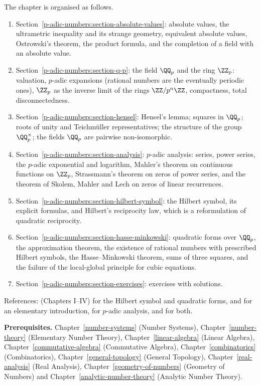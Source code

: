 The chapter is organised as follows.
\begin{enumerate}
\item Section~\ref{p-adic-numbers:section-absolute-values}: absolute values, the ultrametric inequality and its strange geometry, equivalent absolute values, Ostrowski's theorem, the product formula, and
the completion of a field with an absolute value.
\item Section~\ref{p-adic-numbers:section-q-p}: the field $\QQ_p$ and the ring $\ZZ_p$: valuation, $p$-adic expansions (rational numbers are the eventually periodic ones), $\ZZ_p$ as the inverse limit
of the rings $\ZZ/p^n\ZZ$, compactness, total disconnectedness.
\item Section~\ref{p-adic-numbers:section-hensel}: Hensel's lemma; squares in $\QQ_p$; roots of unity and Teichm\"uller representatives; the structure of the group $\QQ_p^\times$; the fields $\QQ_p$ are
pairwise non-isomorphic.
\item Section~\ref{p-adic-numbers:section-analysis}: $p$-adic analysis: series, power series, the $p$-adic exponential and logarithm, Mahler's theorem on continuous functions on $\ZZ_p$, Strassmann's
theorem on zeros of power series, and the theorem of Skolem, Mahler and Lech on zeros of linear recurrences.
\item Section~\ref{p-adic-numbers:section-hilbert-symbol}: the Hilbert symbol, its explicit formulas, and Hilbert's reciprocity law, which is a reformulation of quadratic reciprocity.
\item Section~\ref{p-adic-numbers:section-hasse-minkowski}: quadratic forms over $\QQ_p$, the approximation theorem, the existence of rational numbers with prescribed Hilbert symbols, the
Hasse--Minkowski theorem, sums of three squares, and the failure of the local-global principle for cubic equations.
\item Section~\ref{p-adic-numbers:section-exercises}: exercises with solutions.
\end{enumerate}
References: \cite{serre-arithmetic} (Chapters I--IV) for the Hilbert symbol and quadratic forms, \cite{gouvea-padic} and \cite{koblitz-padic} for an elementary introduction,
\cite{robert-padic} for $p$-adic analysis, and \cite{cassels-local-fields} for both.

\noindent\textbf{Prerequisites.} Chapter~\ref{number-systems} (Number Systems), Chapter~\ref{number-theory} (Elementary Number Theory), Chapter~\ref{linear-algebra} (Linear Algebra),
Chapter~\ref{commutative-algebra} (Commutative Algebra), Chapter~\ref{combinatorics} (Combinatorics), Chapter~\ref{general-topology} (General Topology), Chapter~\ref{real-analysis} (Real Analysis),
Chapter~\ref{geometry-of-numbers} (Geometry of Numbers) and Chapter~\ref{analytic-number-theory} (Analytic Number Theory).

